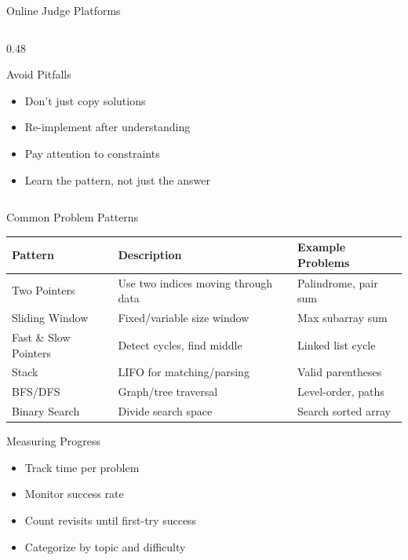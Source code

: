 \documentclass[aspectratio=169,xcolor=dvipsnames]{beamer}
\begin{document}
\begin{frame}{Online Judge Platforms}
\begin{columns}
\begin{column}{0.48\textwidth}
      \vspace{0.2cm}

      \begin{alertblock}{Avoid Pitfalls}
        \begin{itemize}
          \item Don't just copy solutions
          \item Re-implement after understanding
          \item Pay attention to constraints
          \item Learn the pattern, not just the answer
        \end{itemize}
      \end{alertblock}
    \end{column}
  \end{columns}
\end{frame}

\begin{frame}{Common Problem Patterns}
  \begin{center}
    \begin{tabular}{l|p{4cm}|p{4cm}}
      \toprule
      \textbf{Pattern} & \textbf{Description} & \textbf{Example Problems} \\
      \midrule
      Two Pointers & Use two indices moving through data & Palindrome, pair sum \\
      \midrule
      Sliding Window & Fixed/variable size window & Max subarray sum \\
      \midrule
      Fast \& Slow Pointers & Detect cycles, find middle & Linked list cycle \\
      \midrule
      Stack & LIFO for matching/parsing & Valid parentheses \\
      \midrule
      BFS/DFS & Graph/tree traversal & Level-order, paths \\
      \midrule
      Binary Search & Divide search space & Search sorted array \\
      \bottomrule
    \end{tabular}
  \end{center}

  \vspace{0.5cm}

  \begin{block}{Measuring Progress}
    \begin{itemize}
      \item Track time per problem
      \item Monitor success rate
      \item Count revisits until first-try success
      \item Categorize by topic and difficulty
    \end{itemize}
  \end{block}
\end{frame}
\end{document}
